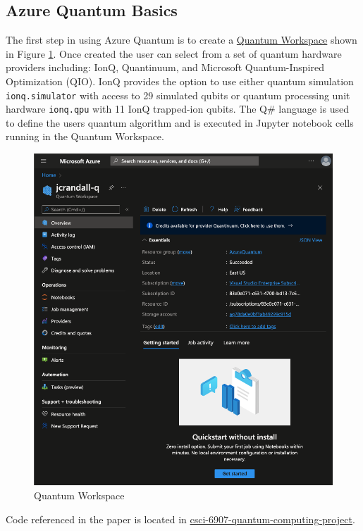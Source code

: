 \documentclass[main.tex]{subfiles}
\begin{document}
\subsection{Azure Quantum Basics} 

    The first step in using Azure Quantum is to create a \href{https://portal.azure.com/#create/Microsoft.AzureQuantum}{Quantum Workspace} shown in Figure \ref{fig:quantumWorkspace}. Once created the user can select from a set of quantum hardware providers including: IonQ, Quantinuum, and Microsoft Quantum-Inspired Optimization (QIO). IonQ provides the option to use either quantum simulation \texttt{ionq.simulator} with access to 29  simulated qubits or quantum processing unit hardware \texttt{ionq.qpu} with 11 IonQ trapped-ion qubits. The Q\# language is used to define the users quantum algorithm and is executed in Jupyter notebook cells running in the Quantum Workspace.\\
    
    \begin{figure}
        \centering
        \includegraphics[width=5in]{paper/figs/quantumWorkspace.png}
            \caption{Quantum Workspace}
        \label{fig:quantumWorkspace}
    \end{figure}

     Code referenced in the paper is located in \href{https://github.com/jwcrandall/csci-6907-quantum-computing-project}{csci-6907-quantum-computing-project}.
\end{document}
